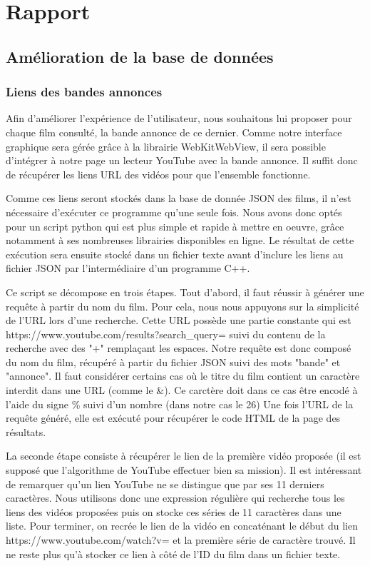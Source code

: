 \documentclass{report}
\begin{document}
\chapter{Rapport}

\section{Amélioration de la base de données}

\subsection{Liens des bandes annonces}
Afin d'améliorer l'expérience de l'utilisateur, nous souhaitons lui proposer pour chaque film consulté, la bande annonce de ce dernier.
Comme notre interface graphique sera gérée grâce à la librairie WebKitWebView, il sera possible d'intégrer à notre page un lecteur YouTube avec la bande annonce.
Il suffit donc de récupérer les liens URL des vidéos pour que l'ensemble fonctionne.\par
Comme ces liens seront stockés dans la base de donnée JSON des films, il n'est nécessaire d'exécuter ce programme qu'une seule fois. Nous avons donc optés pour un script python qui est plus simple et rapide à mettre en oeuvre, grâce notamment à ses nombreuses librairies disponibles en ligne. Le résultat de cette exécution sera ensuite stocké dans un fichier texte avant d'inclure les liens au fichier JSON par l'intermédiaire d'un programme C++.\par
\vspace{0.5cm}
Ce script se décompose en trois étapes.
  Tout d'abord, il faut réussir à générer une requête à partir du nom du film. Pour cela, nous nous appuyons sur la simplicité de l'URL lors d'une recherche. Cette URL possède une partie constante qui est https://www.youtube.com/results?search\_query=  suivi du contenu de la recherche avec des "+" remplaçant les espaces.
Notre requête est donc composé du nom du film, récupéré à partir du fichier JSON suivi des mots "bande" et "annonce". Il faut considérer certains cas où le titre du film contient un caractère interdit dans une URL (comme le \&). Ce carctère doit dans ce cas être encodé à l'aide du signe \% suivi d'un nombre (dans notre cas le 26)
Une fois l'URL de la requête généré, elle est exécuté pour récupérer le code HTML de la page des résultats.\par
La seconde étape consiste à récupérer le lien de la première vidéo proposée (il est supposé que l'algorithme de YouTube effectuer bien sa mission). Il est intéressant de remarquer qu'un lien YouTube ne se distingue que par ses 11 derniers caractères. Nous utilisons donc une expression régulière qui recherche tous les liens des vidéos proposées puis on stocke ces séries de 11 caractères dans une liste.
Pour terminer, on recrée le lien de la vidéo en concaténant le début du lien https://www.youtube.com/watch?v= et la première série de caractère trouvé. Il ne reste plus qu'à stocker ce lien à côté de l'ID du film dans un fichier texte.
\end{document}
